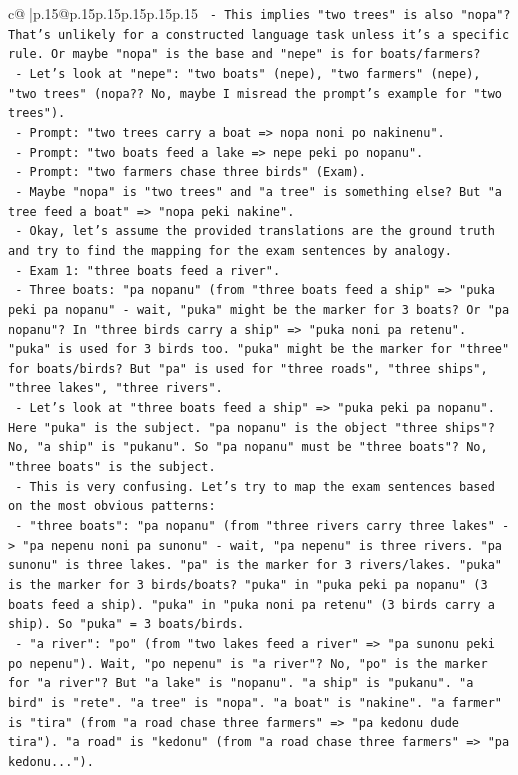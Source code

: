 \documentclass{article}
\begin{document}
{\begin{supertabular}{c@{$\;$}|p{.15\linewidth}@{}p{.15\linewidth}p{.15\linewidth}p{.15\linewidth}p{.15\linewidth}p{.15\linewidth}}
{{{\texttt{      {-} This implies "two trees" is also "nopa"? That's unlikely for a constructed language task unless it's a specific rule. Or maybe "nopa" is the base and "nepe" is for boats/farmers?} \\
\texttt{      {-} Let's look at "nepe": "two boats" (nepe), "two farmers" (nepe), "two trees" (nopa?? No, maybe I misread the prompt's example for "two trees").} \\
\texttt{      {-} Prompt: "two trees carry a boat => nopa noni po nakinenu".} \\
\texttt{      {-} Prompt: "two boats feed a lake => nepe peki po nopanu".} \\
\texttt{      {-} Prompt: "two farmers chase three birds" (Exam).} \\
\texttt{      {-} Maybe "nopa" is "two trees" and "a tree" is something else? But "a tree feed a boat" => "nopa peki nakine".} \\
\texttt{      {-} Okay, let's assume the provided translations are the ground truth and try to find the mapping for the exam sentences by analogy.} \\
\texttt{      {-} Exam 1: "three boats feed a river".} \\
\texttt{        {-} Three boats: "pa nopanu" (from "three boats feed a ship" => "puka peki pa nopanu" {-} wait, "puka" might be the marker for 3 boats? Or "pa nopanu"? In "three birds carry a ship" => "puka noni pa retenu". "puka" is used for 3 birds too. "puka" might be the marker for "three" for boats/birds? But "pa" is used for "three roads", "three ships", "three lakes", "three rivers".} \\
\texttt{        {-} Let's look at "three boats feed a ship" => "puka peki pa nopanu". Here "puka" is the subject. "pa nopanu" is the object "three ships"? No, "a ship" is "pukanu". So "pa nopanu" must be "three boats"? No, "three boats" is the subject.} \\
\texttt{        {-} This is very confusing. Let's try to map the exam sentences based on the most obvious patterns:} \\
\texttt{        {-} "three boats": "pa nopanu" (from "three rivers carry three lakes" {-}> "pa nepenu noni pa sunonu" {-} wait, "pa nepenu" is three rivers. "pa sunonu" is three lakes. "pa" is the marker for 3 rivers/lakes. "puka" is the marker for 3 birds/boats? "puka" in "puka peki pa nopanu" (3 boats feed a ship). "puka" in "puka noni pa retenu" (3 birds carry a ship). So "puka" = 3 boats/birds.} \\
\texttt{        {-} "a river": "po" (from "two lakes feed a river" => "pa sunonu peki po nepenu"). Wait, "po nepenu" is "a river"? No, "po" is the marker for "a river"? But "a lake" is "nopanu". "a ship" is "pukanu". "a bird" is "rete". "a tree" is "nopa". "a boat" is "nakine". "a farmer" is "tira" (from "a road chase three farmers" => "pa kedonu dude tira"). "a road" is "kedonu" (from "a road chase three farmers" => "pa kedonu...").} \\
}}}
\end{supertabular}}
\end{document}
